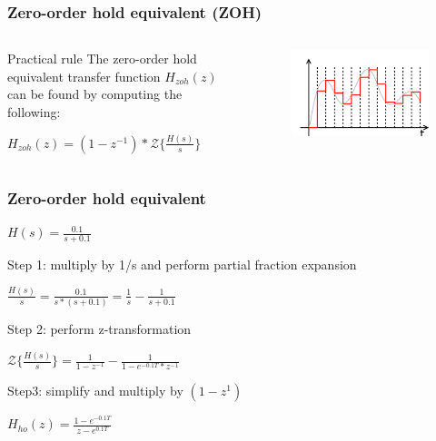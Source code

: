 \begin{frame}
	\frametitle{Zero-order hold equivalent (ZOH)}
\begin{columns}
	\begin{column}{0.5\textwidth}
	\begin{block}{Practical rule}
		The zero-order hold equivalent transfer function $H_{zoh}(z)$ can be found by computing the following:
		\begin{center}
			$H_{zoh}(z) = (1 - z^{-1}) * \mathcal{Z}\{\frac{H(s)}{s}\}$
		\end{center}
	\end{block}
	\end{column}
	
	\begin{column}{0.5\textwidth}
		\begin{figure}
			\centering
			\includegraphics[width=1\linewidth]{zero-order}
		\end{figure}
	\end{column}
\end{columns}
\end{frame}

\begin{frame}
	\frametitle{Zero-order hold equivalent}
	\begin{example}
		\begin{center}
			$H(s) = \frac{0.1}{s + 0.1}$
		\end{center}
		Step 1: multiply by 1/s and perform partial fraction expansion
		\begin{center}
			$\frac{H(s)}{s} = \frac{0.1}{s * (s + 0.1)} = \frac{1}{s} - \frac{1}{s + 0.1}$
		\end{center}
		Step 2: perform z-transformation
		\begin{center}
			$\mathcal{Z} \{\frac{H(s)}{s}\} = \frac{1}{1 - z^{-1}} - \frac{1}{1 - e^{-0.1T} * z^{-1}}$
		\end{center}
		Step3: simplify and multiply by $(1-z^{1})$
		\begin{center}
			$H_{ho}(z) = \frac{1 - e^{-0.1T}}{z - e^{0.1T}}$
		\end{center}
	\end{example}
\end{frame}

